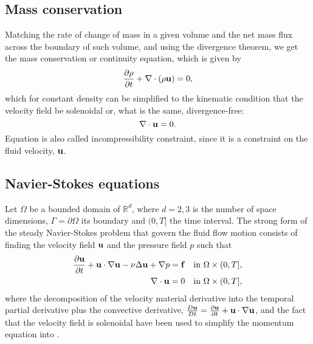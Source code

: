 \subsection{Mass conservation}
\label{subsec-mass_conservation}
Matching the rate of change of mass in a given volume and the net mass flux across the boundary of such volume, and using the divergence theorem, we get the mass conservation or continuity equation, which is given by 
\begin{equation}
\label{eq-continuity_equation_def1}
\frac{\partial\rho}{\partial t}+\nabla\cdot(\rho{\bf u})=0,
\end{equation}
which for constant density can be simplified to the kinematic condition that the velocity field be solenoidal or, what is the same, divergence-free:
\begin{equation}
\label{eq-continuity_equation_def2}
\nabla\cdot{\bf u}=0.
\end{equation}
Equation  is also called incompressibility constraint, since it is a constraint on the fluid velocity, ${\bf u}$.

\subsection{Navier-Stokes equations}
\label{subsec-NS_equations}
Let $\Omega$ be a bounded domain of $\mathbb{R}^d$, where $d=2,3$ is the number of space dimensions, $\Gamma=\partial\Omega$ its boundary and $(0,T]$ the time interval. The strong form of the steady Navier-Stokes problem that govern the fluid flow motion consists of finding the velocity field ${\bf u}$ and the pressure field $p$ such that 
\begin{align}
\label{eq-NS_strong_momentum}
\frac{\partial{\bf u}}{\partial t}+{\bf u}\cdot\nabla{\bf u}-\nu\Delta{\bf u}+\nabla p={\bf f}&\quad\mbox{in }\Omega\times(0,T],\\
\label{eq-NS_strong_continuity}
\nabla\cdot{\bf u}=0&\quad\mbox{in }\Omega\times(0,T],
\end{align}
where the decomposition of the velocity material derivative into the temporal partial derivative plus the convective derivative, $\frac{D{\bf u}}{Dt}=\frac{\partial{\bf u}}{\partial t}+{\bf u}\cdot\nabla{\bf u}$, and the fact that the velocity field is solenoidal have been used to simplify the momentum equation  into .

